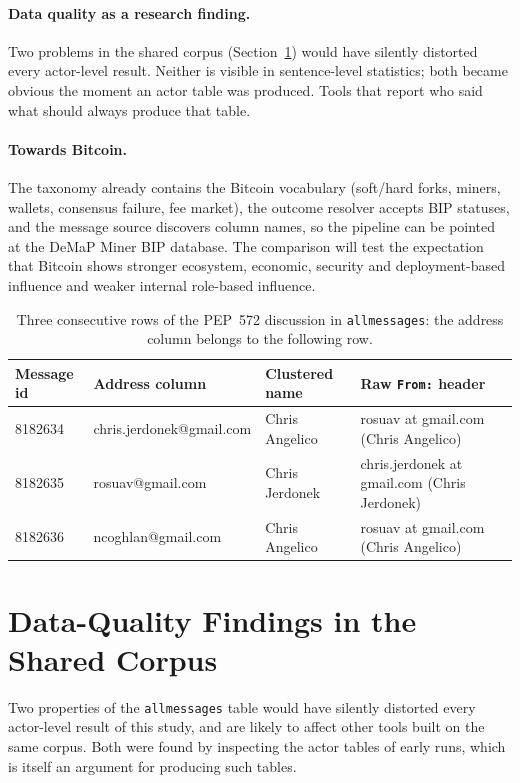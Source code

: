 \documentclass[sigconf,screen]{acmart}
\begin{document}
\paragraph{Data quality as a research finding.} Two problems in the shared corpus (Section~\ref{sec:dataquality}) would have silently distorted every actor-level result. Neither is visible in sentence-level statistics; both became obvious the moment an actor table was produced. Tools that report who said what should always produce that table.

\paragraph{Towards Bitcoin.} The taxonomy already contains the Bitcoin vocabulary (soft/hard forks, miners, wallets, consensus failure, fee market), the outcome resolver accepts BIP statuses, and the message source discovers column names, so the pipeline can be pointed at the DeMaP Miner BIP database. The comparison will test the expectation that Bitcoin shows stronger ecosystem, economic, security and deployment-based influence and weaker internal role-based influence.

\begin{table}[t]
\caption{Three consecutive rows of the PEP~572 discussion in \texttt{allmessages}: the address column belongs to the following row.}
\label{tab:shift}
\small
\begin{tabular}{llll}
\toprule
Message id & Address column & Clustered name & Raw \texttt{From:} header \\
\midrule
8182634 & chris.jerdonek@gmail.com & Chris Angelico & rosuav at gmail.com (Chris Angelico) \\
8182635 & rosuav@gmail.com & Chris Jerdonek & chris.jerdonek at gmail.com (Chris Jerdonek) \\
8182636 & ncoghlan@gmail.com & Chris Angelico & rosuav at gmail.com (Chris Angelico) \\
\bottomrule
\end{tabular}
\end{table}
\section{Data-Quality Findings in the Shared Corpus}
\label{sec:dataquality}

Two properties of the \texttt{allmessages} table would have silently distorted every actor-level result of this study, and are likely to affect other tools built on the same corpus. Both were found by inspecting the actor tables of early runs, which is itself an argument for producing such tables.
\end{document}
